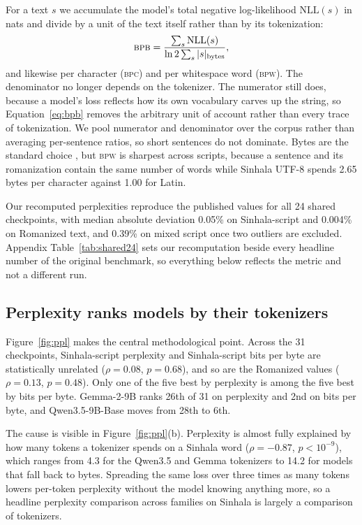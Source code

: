 \documentclass[11pt]{article}
\newcommand{\bpb}{\textsc{bpb}}
\newcommand{\bpw}{\textsc{bpw}}
\newcommand{\bpc}{\textsc{bpc}}
\begin{document}
For a text $s$ we accumulate the model's total negative log-likelihood
$\mathrm{NLL}(s)$ in nats and divide by a unit of the text itself rather than by
its tokenization:
\begin{equation}
\bpb = \frac{\sum_s \mathrm{NLL}(s)}{\ln 2 \sum_s |s|_{\text{bytes}}},
\label{eq:bpb}
\end{equation}
and likewise per character (\bpc) and per whitespace word (\bpw). The denominator
no longer depends on the tokenizer. The numerator still does, because a model's loss
reflects how its own vocabulary carves up the string, so Equation~\ref{eq:bpb}
removes the arbitrary unit of account rather than every trace of tokenization. We
pool numerator and denominator over the corpus rather than averaging per-sentence
ratios, so short sentences do not dominate. Bytes are the standard choice
\citep{gao-etal-2020-pile}, but \bpw{} is sharpest across scripts, because a
sentence and its romanization contain the same number of words while Sinhala UTF-8
spends 2.65 bytes per character against 1.00 for Latin.

Our recomputed perplexities reproduce the published values for all 24 shared
checkpoints, with median absolute deviation 0.05\% on Sinhala-script and 0.004\% on
Romanized text, and 0.39\% on mixed script once two outliers are excluded. Appendix
Table~\ref{tab:shared24} sets our recomputation beside every headline number of the
original benchmark, so everything below reflects the metric and not a different
run.

\subsection{Perplexity ranks models by their tokenizers}

Figure~\ref{fig:ppl} makes the central methodological point. Across the 31
checkpoints, Sinhala-script perplexity and Sinhala-script bits per byte are
statistically unrelated ($\rho = 0.08$, $p = 0.68$), and so are the Romanized
values ($\rho = 0.13$, $p = 0.48$). Only one of the five best by perplexity is among
the five best by bits per byte. Gemma-2-9B ranks 26th of 31 on perplexity and
2nd on bits per byte, and Qwen3.5-9B-Base moves from 28th to 6th.

The cause is visible in Figure~\ref{fig:ppl}(b). Perplexity is almost fully
explained by how many tokens a tokenizer spends on a Sinhala word
($\rho = -0.87$, $p < 10^{-9}$), which ranges from 4.3 for the Qwen3.5 and Gemma
tokenizers to 14.2 for models that fall back to bytes. Spreading the same loss
over three times as many tokens lowers per-token perplexity without the model
knowing anything more, so a headline perplexity comparison across families on
Sinhala is largely a comparison of tokenizers.
\end{document}
